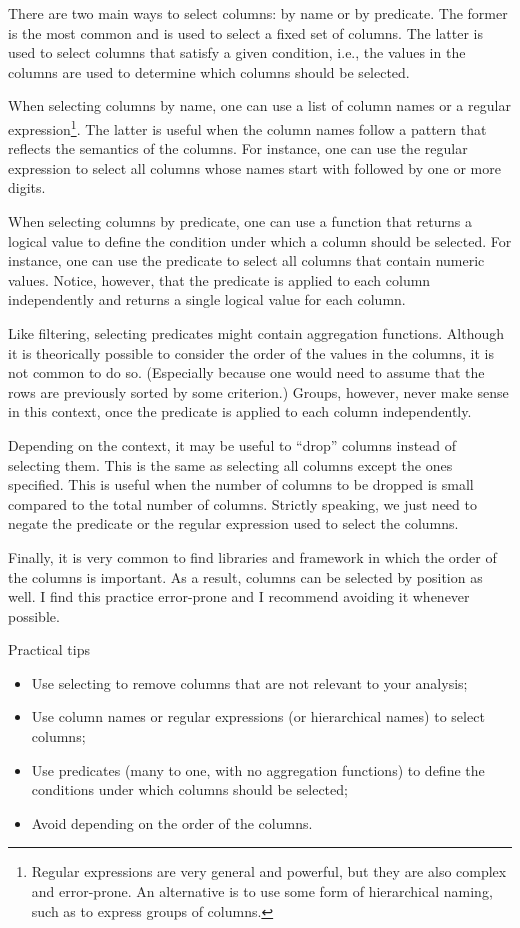 There are two main ways to select columns: by name or by predicate.  The former is the
most common and is used to select a fixed set of columns.  The latter is used to select
columns that satisfy a given condition, i.e., the values in the columns are used to
determine which columns should be selected.

When selecting columns by name, one can use a list of column names or a regular
expression\footnote{Regular expressions are very general and powerful, but they are also
complex and error-prone.  An alternative is to use some form of hierarchical naming,
such as  to express groups of columns.}.
The latter is useful when the column names follow a pattern that reflects the semantics of
the columns.  For instance,
one can use the regular expression  to select all columns whose names
start with  followed by one or more digits.

When selecting columns by predicate, one can use a function that returns a logical value
to define the condition under which a column should be selected.  For instance, one can
use the predicate  to select all columns that contain numeric values.
Notice, however, that the predicate is applied to each column independently and returns a
single logical value for each column.

Like filtering, selecting predicates might contain aggregation functions.  Although it is
theorically possible to consider the order of the values in the columns, it is not common
to do so.  (Especially because one would need to assume that the rows are previously
sorted by some criterion.) Groups, however, never make sense in this context, once the
predicate is applied to each column independently.

Depending on the context, it may be useful to ``drop'' columns instead of selecting them.
This is the same as selecting all columns except the ones specified.  This is useful when
the number of columns to be dropped is small compared to the total number of columns.
Strictly speaking, we just need to negate the predicate or the regular expression used to
select the columns.

Finally, it is very common to find libraries and framework in which the order of the
columns is important.  As a result, columns can be selected by position as well.
I find this practice error-prone and I recommend avoiding it whenever possible.

\begin{hlbox}{Practical tips}
  \begin{itemize}
    \item Use selecting to remove columns that are not relevant to your analysis;
    \item Use column names or regular expressions (or hierarchical names) to select columns;
    \item Use predicates (many to one, with no aggregation functions) to define the conditions
      under which columns should be selected;
    \item Avoid depending on the order of the columns.
  \end{itemize}
\end{hlbox}

